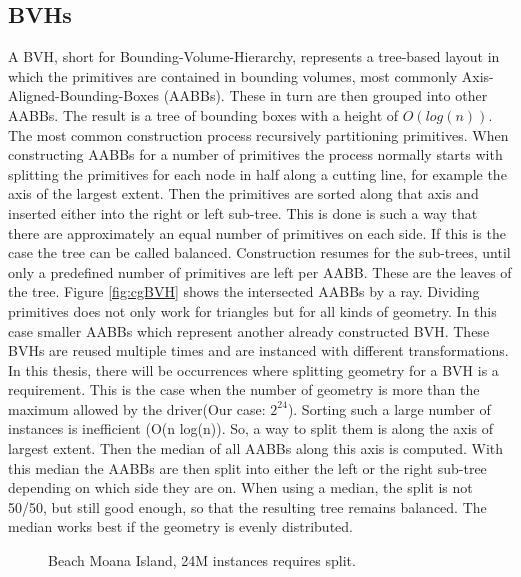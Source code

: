 \subsection{BVHs}
\label{sec:BVH}
A BVH, short for Bounding-Volume-Hierarchy, represents a tree-based layout in which the primitives are contained in bounding volumes, most commonly Axis-Aligned-Bounding-Boxes (AABBs). These in turn are then grouped into other AABBs. The result is a tree of bounding boxes with a height of $O(log(n))$. The most common construction process recursively partitioning primitives. When constructing AABBs for a number of primitives the process normally starts with splitting the primitives for each node in half along a cutting line, for example the axis of the largest extent. Then the primitives are sorted along that axis and inserted either into the right or left sub-tree. This is done is such a way that there are approximately an equal number of primitives on each side. If this is the case the tree can be called balanced. Construction resumes for the sub-trees, until only a predefined number of primitives are left per AABB. These are the leaves of the tree. Figure \ref{fig:cgBVH} shows the intersected AABBs by a ray.
Dividing primitives does not only work for triangles but for all kinds of geometry. In this case smaller AABBs which represent another already constructed BVH. These BVHs are reused multiple times and are instanced with different transformations. In this thesis, there will be occurrences where splitting geometry for a BVH is a requirement. This is the case when the number of geometry is more than the maximum allowed by the driver(Our case: $2^{24}$). Sorting such a large number of instances is inefficient (O(n log(n)). So, a way to split them is along the axis of largest extent. Then the median of all AABBs along this axis is computed. With this median the AABBs are then split into either the left or the right sub-tree depending on which side they are on. When using a median, the split is not 50/50, but still good enough, so that the resulting tree remains balanced. The median works best if the geometry is evenly distributed.\\
\begin{figure}
\caption{Beach Moana Island, 24M instances requires split.}
\label{fig:isBeachFigure}
\end{figure}
